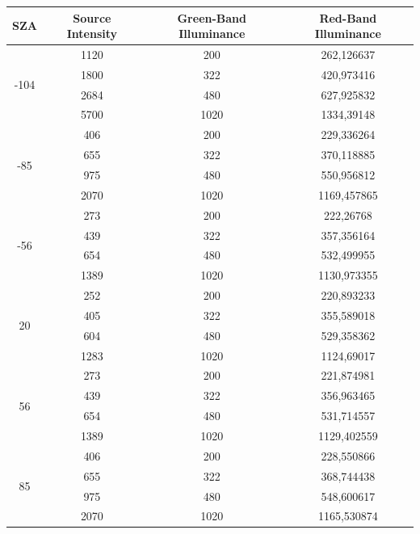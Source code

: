 \begin{table}[H]
\centering
\begin{tabular}{|c|c|c|c|}
\hline

\textbf{SZA} &
\textbf{Source Intensity} &
\textbf{Green-Band Illuminance} &
\textbf{Red-Band Illuminance} \\

\hline

\multirow{4}{*}{-104}
&1120 & 200  & 262,126637\\ \cline{2-4}
& 1800& 322  & 420,973416 \\  \cline{2-4}
&2684 & 480  &  627,925832\\ \cline{2-4}
&5700 & 1020 &  1334,39148\\ \hline

\multirow{4}{*}{-85}
&406 & 200  & 229,336264 \\ \cline{2-4}
& 655& 322  & 370,118885 \\ \cline{2-4}
&975 & 480  &  550,956812\\ \cline{2-4}
&2070 & 1020 & 1169,457865\\ \hline

\multirow{4}{*}{-56}
&273 & 200  & 222,26768\\ \cline{2-4}
&439 & 322  &357,356164 \\ \cline{2-4}
&654 & 480  &532,499955 \\ \cline{2-4}
& 1389& 1020 &1130,973355 \\ \hline

\multirow{4}{*}{20}
&252 & 200  &220,893233 \\ \cline{2-4}
&405 & 322  &355,589018 \\ \cline{2-4}
& 604& 480  &529,358362 \\ \cline{2-4}
&1283 & 1020 &1124,69017 \\ \hline

\multirow{4}{*}{56}
&273 & 200  &221,874981 \\ \cline{2-4}
&439 & 322  & 356,963465 \\ \cline{2-4}
&654 & 480  & 531,714557\\ \cline{2-4}
&1389 & 1020 & 1129,402559\\ \hline

\multirow{4}{*}{85}
& 406 & 200  &228,550866 \\  \cline{2-4}
& 655& 322  &368,744438 \\ \cline{2-4}
&975 & 480  &548,600617 \\ \cline{2-4}
& 2070& 1020 &1165,530874 \\ \hline


\end{tabular}
\end{table}

